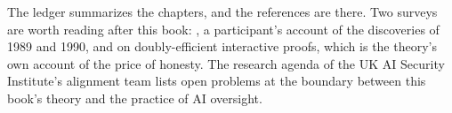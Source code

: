 \begin{refsection}
\notesandrefs

The ledger summarizes the chapters, and the references are there. Two surveys are worth reading after this book: \textcite{Babai1990}, a participant's account of the discoveries of 1989 and 1990, and \textcite{Goldreich2018} on doubly-efficient interactive proofs, which is the theory's own account of the price of honesty. The research agenda of the UK AI Security Institute's alignment team \parencite{HiltonEtAl2025} lists open problems at the boundary between this book's theory and the practice of AI oversight.

\printchapterbib
\end{refsection}
\vifloatrestore
